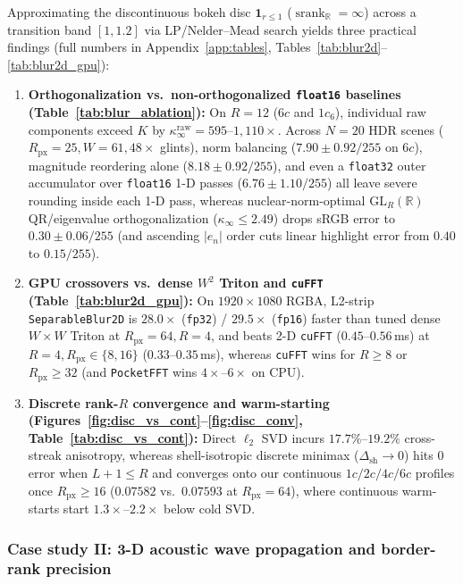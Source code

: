 \documentclass[11pt,a4paper]{article}
\theoremstyle{plain}
\theoremstyle{definition}
\newcommand{\R}{\mathbb{R}}
\DeclareMathOperator{\srank}{srank}
\begin{document}
Approximating the discontinuous bokeh disc $\mathbf{1}_{r \le 1}$ ($\srank_{\R} = \infty$) across a transition band $[1, 1.2]$ via LP/Nelder--Mead search yields three practical findings (full numbers in Appendix~\ref{app:tables}, Tables~\ref{tab:blur2d}--\ref{tab:blur2d_gpu}):
\begin{enumerate}[leftmargin=2em,itemsep=2pt]
  \item \textbf{Orthogonalization vs.\ non-orthogonalized \texttt{float16} baselines (Table~\ref{tab:blur_ablation}):} On $R = 12$ ($6c$ and $1c_6$), individual raw components exceed $K$ by $\kappa_\infty^{\mathrm{raw}} = 595\text{--}1{,}110\times$. Across $N = 20$ HDR scenes ($R_{\mathrm{px}} = 25, W = 61, 48\times$ glints), norm balancing ($7.90 \pm 0.92/255$ on $6c$), magnitude reordering alone ($8.18 \pm 0.92/255$), and even a \texttt{float32} outer accumulator over \texttt{float16} 1-D passes ($6.76 \pm 1.10/255$) all leave severe rounding inside each 1-D pass, whereas nuclear-norm-optimal $\mathrm{GL}_R(\R)$ QR/eigenvalue orthogonalization ($\kappa_\infty \le 2.49$) drops sRGB error to $0.30 \pm 0.06/255$ (and ascending $|e_n|$ order cuts linear highlight error from $0.40$ to $0.15/255$).
  \item \textbf{GPU crossovers vs.\ dense $W^2$ Triton and \texttt{cuFFT} (Table~\ref{tab:blur2d_gpu}):} On $1920 \times 1080$ RGBA, L2-strip \texttt{SeparableBlur2D} is $28.0\times$ (\texttt{fp32}) / $29.5\times$ (\texttt{fp16}) faster than tuned dense $W \times W$ Triton at $R_{\mathrm{px}} = 64, R = 4$, and beats 2-D \texttt{cuFFT} ($0.45\text{--}0.56$\,ms) at $R = 4, R_{\mathrm{px}} \in \{8, 16\}$ ($0.33\text{--}0.35$\,ms), whereas \texttt{cuFFT} wins for $R \ge 8$ or $R_{\mathrm{px}} \ge 32$ (and \texttt{PocketFFT} wins $4\times\text{--}6\times$ on CPU).
  \item \textbf{Discrete rank-$R$ convergence and warm-starting (Figures~\ref{fig:disc_vs_cont}--\ref{fig:disc_conv}, Table~\ref{tab:disc_vs_cont}):} Direct $\ell_2$ SVD incurs $17.7\%\text{--}19.2\%$ cross-streak anisotropy, whereas shell-isotropic discrete minimax ($\Delta_{\mathrm{sh}} \to 0$) hits $0$ error when $L + 1 \le R$ and converges onto our continuous $1c/2c/4c/6c$ profiles once $R_{\mathrm{px}} \ge 16$ ($0.07582$ vs.\ $0.07593$ at $R_{\mathrm{px}} = 64$), where continuous warm-starts start $1.3\times\text{--}2.2\times$ below cold SVD.
\end{enumerate}

\subsubsection{Case study II: 3-D acoustic wave propagation and border-rank precision}\label{sec:acoustics}
\end{document}
